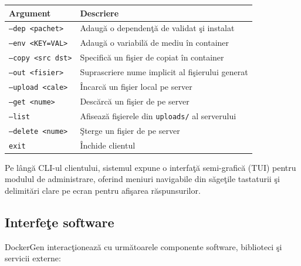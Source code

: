 \documentclass[12pt, a4paper]{article}
\begin{document}
\begin{center}
\begin{tabular}{ll}
\toprule
\textbf{Argument} & \textbf{Descriere} \\
\midrule
\texttt{--dep <pachet>}    & Adaug\u{a} o dependen\c{t}\u{a} de validat \c{s}i instalat \\
\texttt{--env <KEY=VAL>}   & Adaug\u{a} o variabil\u{a} de mediu \^{i}n container \\
\texttt{--copy <src dst>}  & Specific\u{a} un fi\c{s}ier de copiat \^{i}n container \\
\texttt{--out <fisier>}    & Suprascriere nume implicit al fi\c{s}ierului generat \\
\texttt{--upload <cale>}   & \^{I}ncarc\u{a} un fi\c{s}ier local pe server \\
\texttt{--get <nume>}      & Desc\u{a}rc\u{a} un fi\c{s}ier de pe server \\
\texttt{--list}            & Afiseaz\u{a} fi\c{s}ierele din \texttt{uploads/} al serverului \\
\texttt{--delete <nume>}   & \c{S}terge un fi\c{s}ier de pe server \\
\texttt{exit}              & \^{I}nchide clientul \\
\bottomrule
\end{tabular}
\end{center}

Pe l\^{a}ng\u{a} CLI-ul clientului, sistemul expune o interfa\c{t}\u{a} semi-grafic\u{a} (TUI) pentru modulul de
administrare, oferind meniuri navigabile din s\u{a}ge\c{t}ile tastaturii \c{s}i delimit\u{a}ri clare pe ecran pentru
afi\c{s}area r\u{a}spunsurilor.

\subsection{Interfe\c{t}e software}

DockerGen interac\c{t}ioneaz\u{a} cu urm\u{a}toarele componente software, biblioteci \c{s}i servicii externe:
\end{document}
